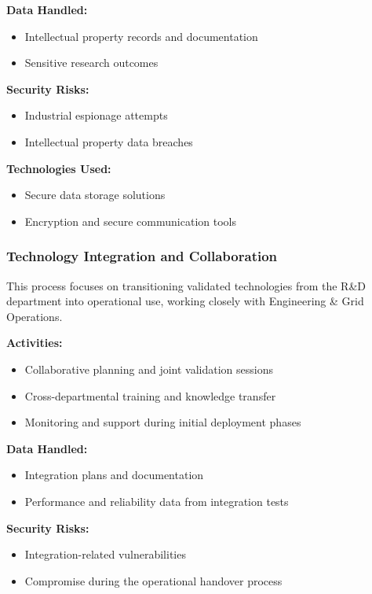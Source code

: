 \textbf{Data Handled:}
\begin{itemize}
    \item Intellectual property records and documentation
    \item Sensitive research outcomes
\end{itemize}

\textbf{Security Risks:}
\begin{itemize}
    \item Industrial espionage attempts
    \item Intellectual property data breaches
\end{itemize}

\textbf{Technologies Used:}
\begin{itemize}
    \item Secure data storage solutions
    \item Encryption and secure communication tools
\end{itemize}

\subsubsection{Technology Integration and Collaboration}

This process focuses on transitioning validated technologies from the R\&D department into operational use, working closely with Engineering \& Grid Operations.

\textbf{Activities:}
\begin{itemize}
    \item Collaborative planning and joint validation sessions
    \item Cross-departmental training and knowledge transfer
    \item Monitoring and support during initial deployment phases
\end{itemize}

\textbf{Data Handled:}
\begin{itemize}
    \item Integration plans and documentation
    \item Performance and reliability data from integration tests
\end{itemize}

\textbf{Security Risks:}
\begin{itemize}
    \item Integration-related vulnerabilities
    \item Compromise during the operational handover process
\end{itemize}

